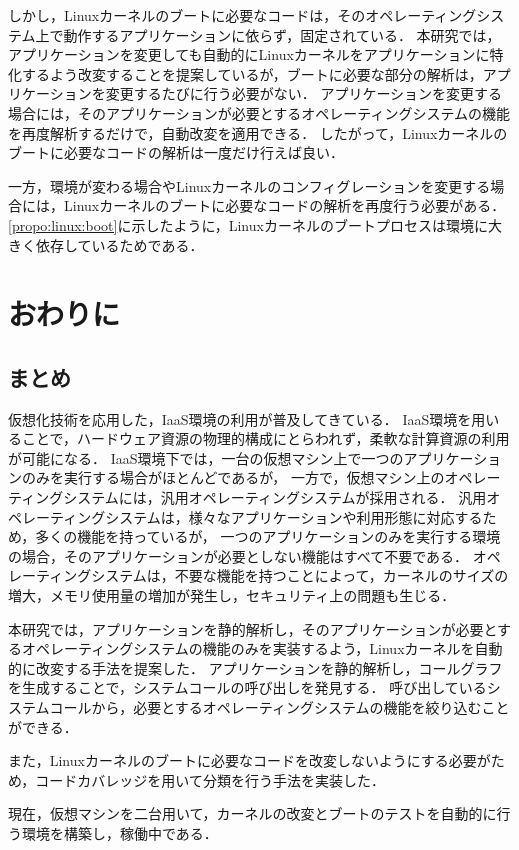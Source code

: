 \documentclass[graduation-thesis]{mlarticle}
\begin{document}
しかし，Linuxカーネルのブートに必要なコードは，そのオペレーティングシステム上で動作するアプリケーションに依らず，固定されている．
本研究では，アプリケーションを変更しても自動的にLinuxカーネルをアプリケーションに特化するよう改変することを提案しているが，ブートに必要な部分の解析は，アプリケーションを変更するたびに行う必要がない．
アプリケーションを変更する場合には，そのアプリケーションが必要とするオペレーティングシステムの機能を再度解析するだけで，自動改変を適用できる．
したがって，Linuxカーネルのブートに必要なコードの解析は一度だけ行えば良い．

一方，環境が変わる場合やLinuxカーネルのコンフィグレーションを変更する場合には，Linuxカーネルのブートに必要なコードの解析を再度行う必要がある．
\ref{propo:linux:boot}に示したように，Linuxカーネルのブートプロセスは環境に大きく依存しているためである．

\clearpage
\section{おわりに}
\label{conclusion}
\subsection{まとめ}
仮想化技術を応用した，IaaS環境の利用が普及してきている．
IaaS環境を用いることで，ハードウェア資源の物理的構成にとらわれず，柔軟な計算資源の利用が可能になる．
IaaS環境下では，一台の仮想マシン上で一つのアプリケーションのみを実行する場合がほとんどであるが，
一方で，仮想マシン上のオペレーティングシステムには，汎用オペレーティングシステムが採用される．
汎用オペレーティングシステムは，様々なアプリケーションや利用形態に対応するため，多くの機能を持っているが，
一つのアプリケーションのみを実行する環境の場合，そのアプリケーションが必要としない機能はすべて不要である．
オペレーティングシステムは，不要な機能を持つことによって，カーネルのサイズの増大，メモリ使用量の増加が発生し，セキュリティ上の問題も生じる．

本研究では，アプリケーションを静的解析し，そのアプリケーションが必要とするオペレーティングシステムの機能のみを実装するよう，Linuxカーネルを自動的に改変する手法を提案した．
アプリケーションを静的解析し，コールグラフを生成することで，システムコールの呼び出しを発見する．
呼び出しているシステムコールから，必要とするオペレーティングシステムの機能を絞り込むことができる．

また，Linuxカーネルのブートに必要なコードを改変しないようにする必要がため，コードカバレッジを用いて分類を行う手法を実装した．

現在，仮想マシンを二台用いて，カーネルの改変とブートのテストを自動的に行う環境を構築し，稼働中である．
\end{document}

